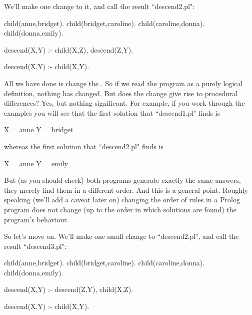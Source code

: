 We'll make one change to it, and call the result ``descend2.pl":
\begin{LPNcodedisplay}
child(anne,bridget).
child(bridget,caroline).
child(caroline,donna).
child(donna,emily).

descend(X,Y) :- child(X,Z),
                 descend(Z,Y).

descend(X,Y) :- child(X,Y).
\end{LPNcodedisplay}

All we have done is change the . So if we read the
program as a purely logical definition, nothing has changed.  But does
the change give rise to procedural differences?  Yes, but nothing
significant. For example, if you work through the examples you
will see that the first solution that ``descend1.pl" finds is
\begin{LPNcodedisplay}
X = anne
Y = bridget
\end{LPNcodedisplay}
whereas the first solution that ``descend2.pl" finds is
\begin{LPNcodedisplay}
X = anne
Y = emily
\end{LPNcodedisplay}
But (as you should check) both programs generate exactly the same
answers, they merely find them in a different order. And this is a
general point. Roughly speaking (we'll add a caveat later on) changing
the order of rules in a Prolog program does not change (up to the
order in which solutions are found) the program's behaviour.

So let's move on. We'll make one small change to ``descend2.pl", and
call the result ``descend3.pl":
\begin{LPNcodedisplay}
child(anne,bridget).
child(bridget,caroline).
child(caroline,donna).
child(donna,emily).

descend(X,Y) :- descend(Z,Y),
                 child(X,Z).

descend(X,Y) :- child(X,Y).
\end{LPNcodedisplay}

